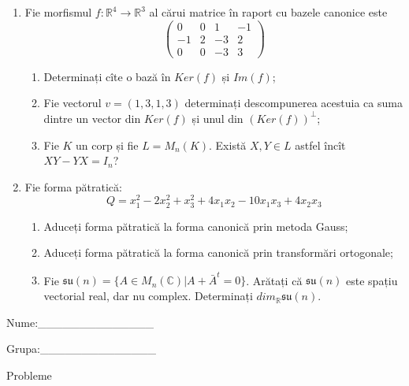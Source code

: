 \documentclass{article}
\begin{document}
\begin{enumerate}
 \item Fie morfismul $f:\mathbb{R}^4 \to \mathbb{R}^3$ al cărui matrice în raport cu bazele canonice este
$$\begin{pmatrix}
0&0&1&-1\\
-1&2&-3&2\\
0&0&-3&3
\end{pmatrix}$$

\begin{enumerate}
\item Determinați cîte o bază în $Ker(f)$ și $Im(f)$;
\item Fie vectorul $v=(1,3,1,3)$ determinați descompunerea acestuia ca suma dintre un vector din $Ker(f)$ și unul din $(Ker(f))^\perp$;
\item Fie $K$ un corp și fie $L=M_n(K)$. Există $X,Y \in L$ astfel încît $XY-YX=I_n$?  
\end{enumerate}
\item Fie forma pătratică:
$$Q= x_1^2-2x_2^2+x_3^2+4x_1x_2-10x_1x_3+4x_2x_3$$

\begin{enumerate}
\item Aduceți forma pătratică la forma canonică prin metoda Gauss;
\item Aduceți forma pătratică la forma canonică prin transformări ortogonale;
\item Fie $\mathfrak{su}(n)=\{ A \in M_n(\mathbb{C}) | A+\bar{A}^t=0\}$. Arătați că $\mathfrak{su}(n)$ este spațiu vectorial real, dar nu complex.
Determinați $dim_{\mathbb{R}}\mathfrak{su}(n)$.
\end{enumerate}
\end{enumerate}
\newpage
\begin{flushright}
Nume:\_\_\_\_\_\_\_\_\_\_\_\_\_\_
 
 
Grupa:\_\_\_\_\_\_\_\_\_\_\_\_\_\_
\end{flushright}
\begin{center}
\vspace{2cm}
{\Large Probleme}
\vspace{2cm}
\end{center}
\end{document}
